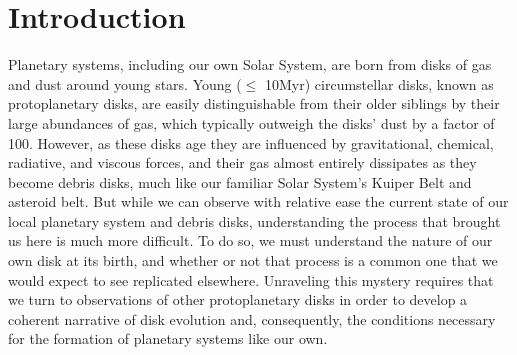 \chapter{Introduction}
\label{chap:introduction}

%


Planetary systems, including our own Solar System, are born from disks of gas and dust around young stars. Young ($\leq$ 10Myr) circumstellar disks, known as protoplanetary disks, are easily distinguishable from their older siblings by their large abundances of gas, which typically outweigh the disks' dust by a factor of 100. However, as these disks age they are influenced by gravitational, chemical, radiative, and viscous forces, and their gas almost entirely dissipates as they become debris disks, much like our familiar Solar System's Kuiper Belt and asteroid belt. But while we can observe with relative ease the current state of our local planetary system and debris disks, understanding the process that brought us here is much more difficult. To do so, we must understand the nature of our own disk at its birth, and whether or not that process is a common one that we would expect to see replicated elsewhere. Unraveling this mystery requires that we turn to observations of other protoplanetary disks in order to develop a coherent narrative of disk evolution and, consequently, the conditions necessary for the formation of planetary systems like our own.

